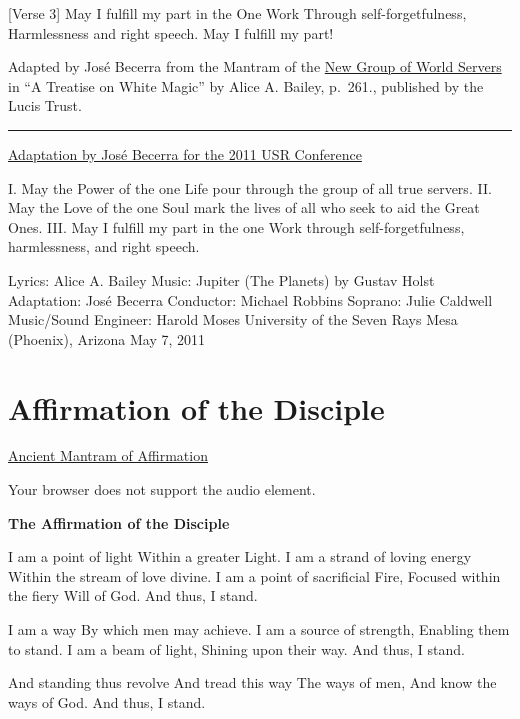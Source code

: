 \documentclass[
]{book}
\begin{document}
{[}Verse 3{]}
May I fulfill my part in the One Work
Through self-forgetfulness,
Harmlessness and right speech.
May I fulfill my part!

Adapted by José Becerra from the Mantram of the \href{https://www.lucistrust.org/mantrams//the_mantram_the_new_group_world_servers1}{New Group of World Servers} in ``A Treatise on White Magic'' by Alice A. Bailey, p.~261., published by the Lucis Trust.

\begin{center}\rule{0.5\linewidth}{0.5pt}\end{center}

\href{https://www.youtube.com/watch?v=JNcTAGIdX0w}{Adaptation by José Becerra for the 2011 USR Conference}

I. May the Power of the one Life pour through the group of all true servers.
II. May the Love of the one Soul mark the lives of all who seek to aid the Great Ones.
III. May I fulfill my part in the one Work through self-forgetfulness, harmlessness, and right speech.

Lyrics: Alice A. Bailey
Music: Jupiter (The Planets) by Gustav Holst
Adaptation: José Becerra
Conductor: Michael Robbins
Soprano: Julie Caldwell
Music/Sound Engineer: Harold Moses
University of the Seven Rays
Mesa (Phoenix), Arizona
May 7, 2011

\hypertarget{affirmation-of-the-disciple}{%
\chapter{Affirmation of the Disciple}\label{affirmation-of-the-disciple}}

\href{https://ngsm.org/mp3/The\%20Affirmation\%20of\%20the\%20Disciple.mp3}{Ancient Mantram of Affirmation}

Your browser does not support the audio element.

\textbf{The Affirmation of the Disciple}

I am a point of light
Within a greater Light.
I am a strand of loving energy
Within the stream of love divine.
I am a point of sacrificial Fire,
Focused within the fiery Will of God.
And thus, I stand.

I am a way
By which men may achieve.
I am a source of strength,
Enabling them to stand.
I am a beam of light,
Shining upon their way.
And thus, I stand.

And standing thus revolve
And tread this way
The ways of men,
And know the ways of God.
And thus, I stand.
\end{document}
